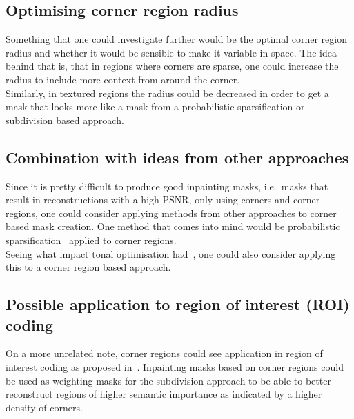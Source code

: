 \subsection*{Optimising corner region radius}

Something that one could investigate further would be the optimal corner region radius and whether
it would be sensible to make it variable in space. The idea behind that is, that in regions where
corners are sparse, one could increase the radius to include more context from around the corner.\\
Similarly, in textured regions the radius could be decreased in order to get a mask that looks more
like a mask from a probabilistic sparsification or subdivision based approach.

\subsection*{Combination with ideas from other approaches}

Since it is pretty difficult to produce good inpainting masks, i.e.\ masks that result in
reconstructions with a high PSNR, only using corners and corner regions, one could consider
applying methods from other approaches to corner based mask creation. One method that comes into
mind would be probabilistic sparsification~\cite{hoeltgen12, schmaltz14} applied to corner regions.\\
Seeing what impact tonal optimisation had~\cite{hoeltgen12, schmaltz14}, one could also consider
applying this to a corner region based approach.

\subsection*{Possible application to region of interest (ROI) coding}

On a more unrelated note, corner regions could see application in region of interest coding as
proposed in~\cite{peter15}. Inpainting masks based on corner regions could be used as weighting
masks for the subdivision approach to be able to better reconstruct regions of higher semantic
importance as indicated by a higher density of corners.
